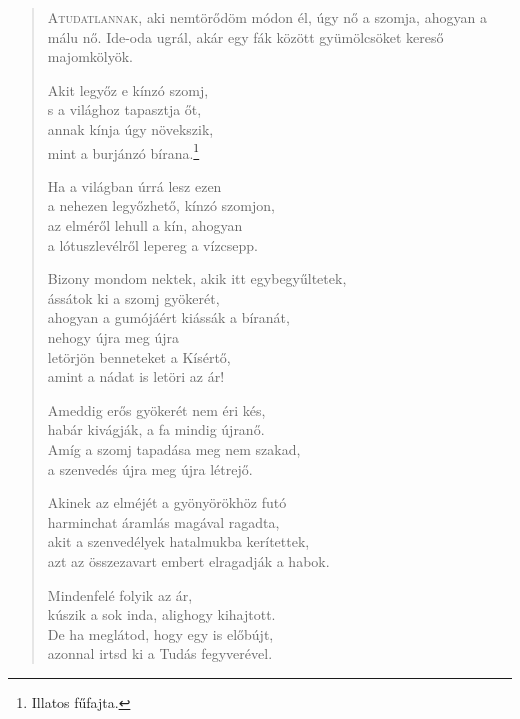 
\begin{verse}

{\par%
\lettrine{A}{tudatlannak,} {\LettrineTextFont aki nemtörődöm módon él,}\newline
úgy nő a szomja, ahogyan a málu nő.\newline
Ide-oda ugrál, akár egy fák között\verselinebreak
gyümölcsöket kereső majomkölyök.
\par}

 Akit legyőz e kínzó szomj,\\
s a világhoz tapasztja őt,\\
annak kínja úgy növekszik,\\
mint a burjánzó bírana.\footnote{Illatos fűfajta.}

 Ha a világban úrrá lesz ezen\\
a nehezen legyőzhető, kínzó szomjon,\\
az elméről lehull a kín, ahogyan\\
a lótuszlevélről lepereg a vízcsepp.

 Bizony mondom nektek, akik itt egybegyűltetek,\\
ássátok ki a szomj gyökerét,\\
ahogyan a gumójáért kiássák a bíranát,\\
nehogy újra meg újra\\
letörjön benneteket a Kísértő,\\
amint a nádat is letöri az ár!

 Ameddig erős gyökerét nem éri kés,\\
habár kivágják, a fa mindig újranő.\\
Amíg a szomj tapadása meg nem szakad,\\
a szenvedés újra meg újra létrejő.

 Akinek az elméjét a gyönyörökhöz futó\\
harminchat áramlás magával ragadta,\\
akit a szenvedélyek hatalmukba kerítettek,\\
azt az összezavart embert elragadják a habok.

 Mindenfelé folyik az ár,\\
kúszik a sok inda, alighogy kihajtott.\\
De ha meglátod, hogy egy is előbújt,\\
azonnal irtsd ki a Tudás fegyverével.


\end{verse}
